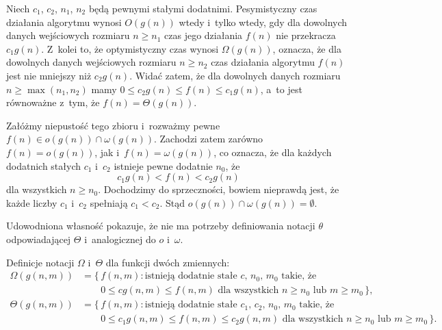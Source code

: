 \exercise %
Niech $c_1$, $c_2$, $n_1$, $n_2$ będą pewnymi stałymi dodatnimi.
Pesymistyczny czas działania algorytmu wynosi $O(g(n))$ wtedy i~tylko wtedy, gdy dla dowolnych danych wejściowych rozmiaru $n\ge n_1$ czas jego działania $f(n)$ nie przekracza $c_1g(n)$.
Z~kolei to, że optymistyczny czas wynosi $\Omega(g(n))$, oznacza, że dla dowolnych danych wejściowych rozmiaru $n\ge n_2$ czas działania algorytmu $f(n)$ jest nie mniejszy niż $c_2g(n)$.
Widać zatem, że dla dowolnych danych rozmiaru $n\ge\max(n_1,n_2)$ mamy $0\le c_2g(n)\le f(n)\le c_1g(n)$, a~to jest równoważne z~tym, że $f(n)=\Theta(g(n))$.

\exercise %
Załóżmy niepustość tego zbioru i~rozważmy pewne $f(n)\in o(g(n))\cap\omega(g(n))$.
Zachodzi zatem zarówno $f(n)=o(g(n))$, jak i~$f(n)=\omega(g(n))$, co oznacza, że dla każdych dodatnich stałych $c_1$ i~$c_2$ istnieje pewne dodatnie $n_0$, że
\[
	c_1g(n) < f(n) < c_2g(n)
\]
dla wszystkich $n\ge n_0$.
Dochodzimy do sprzeczności, bowiem nieprawdą jest, że każde liczby $c_1$ i~$c_2$ spełniają $c_1<c_2$.
Stąd $o(g(n))\cap\omega(g(n))=\emptyset$.

Udowodniona własność pokazuje, że nie ma potrzeby definiowania notacji $\theta$ odpowiadającej $\Theta$ i~analogicznej do $o$ i~$\omega$.

\exercise %

\noindent Definicje notacji $\Omega$ i~$\Theta$ dla funkcji dwóch zmiennych:
\[
	\begin{split}
		\Omega(g(n,m)) &= \bigl\{\,f(n,m):\text{istnieją dodatnie stałe $c$, $n_0$, $m_0$ takie, że} \\
		&\qquad 0 \le cg(n,m) \le f(n,m) \text{ dla wszystkich $n \ge n_0$ lub $m \ge m_0$}\,\bigr\}, \\[2mm]
		\Theta(g(n,m)) &= \bigl\{\,f(n,m):\text{istnieją dodatnie stałe $c_1$, $c_2$, $n_0$, $m_0$ takie, że} \\
		&\qquad 0 \le c_1g(n,m) \le f(n,m) \le c_2g(n,m) \text{ dla wszystkich $n \ge n_0$ lub $m \ge m_0$}\,\bigr\}.
	\end{split}
\]
